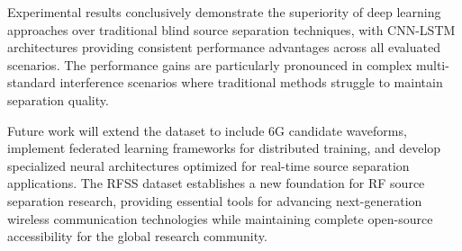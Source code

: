 \documentclass[twocolumn]{article}
\begin{document}
Experimental results conclusively demonstrate the superiority of deep learning approaches over traditional blind source separation techniques, with CNN-LSTM architectures providing consistent performance advantages across all evaluated scenarios. The performance gains are particularly pronounced in complex multi-standard interference scenarios where traditional methods struggle to maintain separation quality.

Future work will extend the dataset to include 6G candidate waveforms, implement federated learning frameworks for distributed training, and develop specialized neural architectures optimized for real-time source separation applications. The RFSS dataset establishes a new foundation for RF source separation research, providing essential tools for advancing next-generation wireless communication technologies while maintaining complete open-source accessibility for the global research community.



\end{document}

